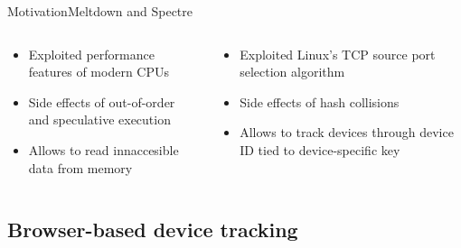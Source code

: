 \documentclass[aspectratio=169, hyperref={colorlinks=true, allcolors=SecondaryColor}, c]{beamer}
\begin{document}
\begin{frame}[fragile]{Motivation}{Meltdown and Spectre}
\begin{columns}
			\begin{column}[t]{0.5\textwidth}
				\begin{itemize}
					\item \alert{Exploited} performance features of modern CPUs
					\item \alert{Side effects} of out-of-order and speculative execution
					\item \alert{Allows} to read innaccesible data from memory
				\end{itemize}
			\end{column}
			\begin{column}[t]{0.5\textwidth}
				\begin{itemize}
					\item \alert{Exploited} Linux’s TCP source port selection algorithm
					\item \alert{Side effects} of hash collisions
					\item \alert{Allows} to track devices through device ID tied to device-specific key
				\end{itemize}
			\end{column}
		\end{columns}
	\end{frame}

	\subsection{Browser-based device tracking}
\end{document}
